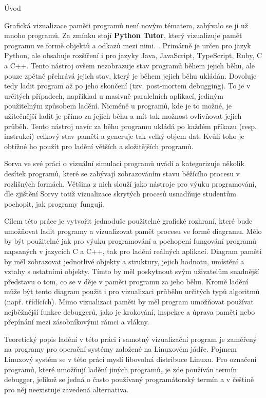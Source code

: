 \documentclass[czech,bachelor,male,python,dept460,hidelinks]{diploma}						%
\newcommand{\parspace}[1][]{
	\ifthenelse{\isempty{#1}}{\vspace{5mm}}{\vspace{#1}}
	\par
}
\begin{document}
\begin{section}{Úvod}
	\parspace Grafická vizualizace paměti programů není novým tématem, zabývalo se jí už mnoho programů. Za zmínku stojí \textbf{Python Tutor}, který vizualizuje
	paměť programu ve formě objektů a odkazů mezi nimi. \cite{GuoSIGCSE2013}.
	Primárně je určen pro jazyk Python, ale obsahuje rozšíření i pro jazyky Java, JavaScript, TypeScript, Ruby, C a C++.
	Tento nástroj ovšem nezobrazuje stav programů během jejich běhu, ale pouze zpětně přehrává jejich stav, který je během jejich běhu ukládán.
	Dovoluje tedy ladit program až po jeho skončení (tzv. post-mortem debugging). To je v určitých případech, například u masivně
	paralelních aplikací, jediným použitelným způsobem ladění. Nicméně u programů, kde je to možné, je užitečnější ladit je přímo za jejich běhu a mít
	tak možnost ovlivňovat jejich průběh. Tento nástroj navíc za běhu programu ukládá po každém příkazu (resp. instrukci) celkový stav paměti
	a generuje tak velký objem dat. Kvůli toho je obtížné ho použít pro ladění větších a složitějších programů.
	
	\parspace Sorva ve své práci o vizuální simulaci programů \cite[140]{sorva2012visual} uvádí a kategorizuje několik desítek programů,
	které se zabývají zobrazováním stavu běžícího procesu v rozlišných formách. Většina z nich slouží jako nástroje pro výuku programování,
	dle zjištění Sorvy totiž vizualizace skrytých procesů usnadňuje studentům pochopit, jak programy fungují. \cite[212]{sorva2012visual}
	
	\parspace Cílem této práce je vytvořit jednoduše použitelné grafické rozhraní, které bude umožňovat ladit programy a vizualizovat paměť procesu
	ve formě diagramu. Mělo by být použitelné jak pro výuku programování a pochopení fungování programů napsaných v jazycích C a C++, tak pro ladění reálných
	aplikací. Diagram paměti by měl zobrazovat jednotlivé objekty a struktury, jejich hodnotu, umístění a vztahy s ostatními objekty.
	Tímto by měl poskytnout svým uživatelům snadnější představu o tom, co se v děje v paměti programu za jeho běhu.
	Kromě ladění může být tento diagram použit i pro vizualizaci průběhu určitých typů algoritmů (např. třídících). Mimo vizualizaci paměti by měl program
	umožňovat používat nejběžnější funkce debuggerů, jako je krokování, inspekce a úprava paměti nebo přepínání mezi zásobníkovými rámci a vlákny.
	
	\parspace Teoretický popis ladění v této práci i samotný vizualizační program je zaměřený na programy pro operační systémy založené na Linuxovém jádře.
	Pojmem Linuxový systém se v této práci myslí libovolná distribuce Linuxu. Pro označení programů, které umožňují ladění jiných programů,
	je zde používán termín debugger, jelikož se jedná o často používaný programátorský termín a v češtině pro něj neexistuje zavedená alternativa.


\end{section}
\end{document}
